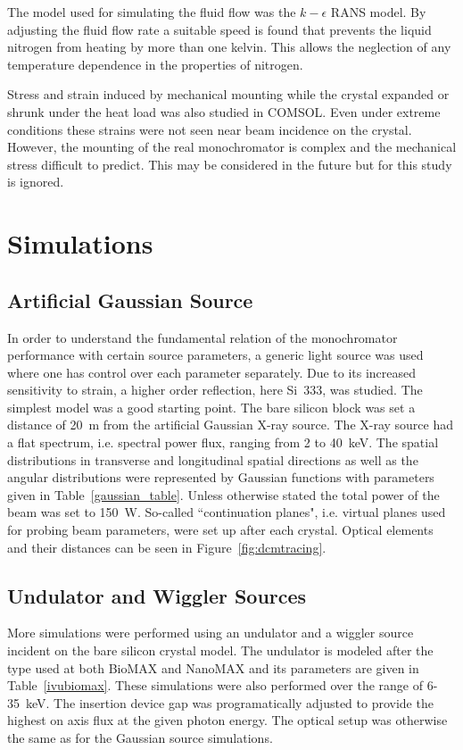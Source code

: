 \documentclass[preprint]{iucr}              %
\begin{document}
The model used for simulating the fluid flow was the $k-\epsilon$ RANS model. By adjusting the fluid flow rate a suitable speed is found that prevents the liquid nitrogen from heating by more than one kelvin. This allows the neglection of any temperature dependence in the properties of nitrogen.

Stress and strain induced by mechanical mounting while the crystal expanded or shrunk under the heat load was also studied in COMSOL. Even under extreme conditions these strains were not seen near beam incidence on the crystal. However, the mounting of the real monochromator is complex and the mechanical stress difficult to predict. This may be considered in the future but for this study is ignored.

\section{Simulations}

\subsection{Artificial Gaussian Source}
In order to understand the fundamental relation of the monochromator performance with certain source parameters, a generic light source was used where one has control over each parameter separately. Due to its increased sensitivity to strain, a higher order reflection, here Si~333, was studied. The simplest model was a good starting point. The bare silicon block was set a distance of 20~m from the artificial Gaussian X-ray source. The X-ray source had a flat spectrum, i.e. spectral power flux, ranging from 2 to 40~keV. The spatial distributions in transverse and longitudinal spatial directions as well as the angular distributions were represented by Gaussian functions with parameters given in Table~\ref{gaussian_table}. Unless otherwise stated the total power of the beam was set to 150~W. So-called ``continuation planes", i.e. virtual planes used for probing beam parameters, were set up after each crystal. Optical elements and their distances can be seen in Figure~\ref{fig:dcmtracing}.

\subsection{Undulator and Wiggler Sources}\label{undulatorsource}
More simulations were performed using an undulator and a wiggler source incident on the bare silicon crystal model. The undulator is modeled after the type used at both BioMAX and NanoMAX and its parameters are given in Table~\ref{ivubiomax}. These simulations were also performed over the range of 6-35~keV. The insertion device gap was programatically adjusted to provide the highest on axis flux at the given photon energy. The optical setup was otherwise the same as for the Gaussian source simulations.
\end{document}

